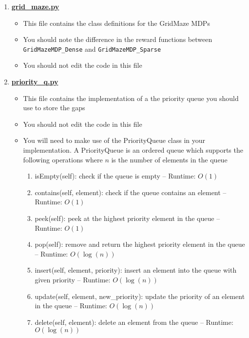 \documentclass[12pt]{exam}
\begin{document}
\begin{questions}
\begin{enumerate}
    \item {\bf \href{https://github.com/TikhonJelvis/RL-book/tree/master/rl/midterm\_2022/grid\_maze.py/}{grid\_maze.py}}
    \begin{itemize}
        \item This file contains the class definitions for the GridMaze MDPs
        \item You should note the difference in the reward functions between \verb|GridMazeMDP_Dense| and \verb|GridMazeMDP_Sparse|
        \item You should not edit the code in this file
    \end{itemize}
    \item {\bf \href{https://github.com/TikhonJelvis/RL-book/tree/master/rl/midterm\_2022/priority\_q.py}{priority\_q.py}}
    \begin{itemize}
        \item This file contains the implementation of a the priority queue you should use to store the gaps
        \item You should not edit the code in this file
        \item You will need to make use of the PriorityQueue class in your implementation. A PriorityQueue is an ordered queue which supports the following operations where $n$ is the number of elements in the queue
        \begin{enumerate}
            \item isEmpty(self): check if the queue is empty -- Runtime: $O(1)$
            \item contains(self, element): check if the queue contains an element -- Runtime: $O(1)$
            \item peek(self): peek at the highest priority element in the queue -- Runtime: $O(1)$
            \item pop(self): remove and return the highest priority element in the queue -- Runtime: $O(\log(n))$
            \item insert(self, element, priority): insert an element into the queue with given priority -- Runtime: $O(\log(n))$
            \item update(self, element, new\_priority): update the priority of an element in the queue -- Runtime: $O(\log(n))$
            \item delete(self, element): delete an element from the queue -- Runtime: $O(\log(n))$
        \end{enumerate}

\end{itemize}
\end{enumerate}
\end{questions}
\end{document}
